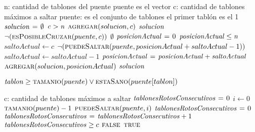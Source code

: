 \vspace*{0.5cm}


\begin{codebox}
\li \Comment n: cantidad de tablones del puente puente es el vector
\li \Comment c: cantidad de tablones máximos a saltar
\li \Comment puente: es el conjunto de tablones
\li \Comment el primer tablón es el 1
\li $\id{solucion} \gets \emptyset$
\li \If $\id{c} > \id{n}$
\li     \Then
            $\textnormal{\scshape agregar}(solucion, c)$
\li         \Return $\id{solucion}$
        \End
\li \If $\neg(\textnormal{\scshape esPosibleCruzar}(puente, c))$
\li     \Then
            \Return $\emptyset$
        \End
\li $\id{posicionActual} \gets 0$
\li \While $\id{posicionActual} \leq \id{n}$
\li     \Do
            $saltoActual \gets c$
\li         \While $\neg(\textnormal{\scshape puedeSaltar}(puente, posicionActual + saltoActual - 1))$
\li         \Do
                $saltoActual \gets saltoActual - 1$
            \End
\li     $\id{posicionActual} \gets \id{posicionActual} + \id{saltoActual}$
\li     $\textnormal{\scshape agregar}(solucion, posicionActual)$
        \End
\li \Return $\id{solucion}$
\end{codebox}



\vspace*{0.5cm}



\begin{codebox}
    \Return $\id{tablon} \geq \proc{tamanio}(puente) \lor \proc{estaSano}(puente[tablon])$
\end{codebox}



\vspace*{0.5cm}



\begin{codebox}
\li \Comment c: cantidad de tablones máximos a saltar
\li $\id{tablonesRotosConsecutivos} \gets 0$
\li \For $i \gets 0$ \To $\textnormal{\scshape tamanio}(puente) - 1$
\li     \Do
            \If $\textnormal{\scshape puedeSaltar}(puente, i)$
\li             \Then
                    $\id{tablonesRotosConsecutivos} \gets 0$
\li         \Else
\li             $\id{tablonesRotosConsecutivos} \gets \id{tablonesRotosConsecutivos} + 1$
            \End
\li         \If $\id{tablonesRotosConsecutivos} \geq c$
\li             \Then
                    \Return $\textnormal{\scshape false}$
            \End
        \End
\li \Return $\textnormal{\scshape true}$
\end{codebox}



